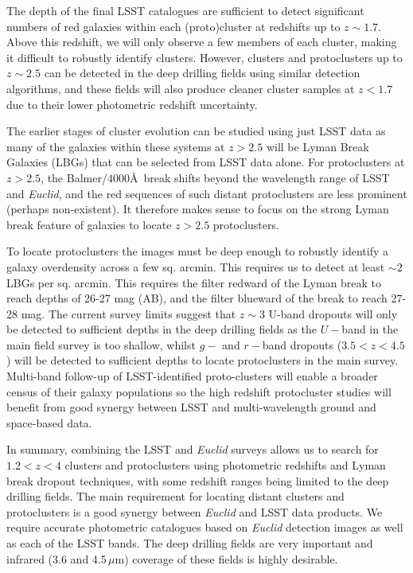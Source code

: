 \documentclass[a4paper,11pt]{article}
\begin{document}
The depth of the final LSST catalogues are sufficient to detect
significant numbers of red galaxies within each (proto)cluster at
redshifts up to $z\sim1.7$. Above this redshift, we will only 
observe a few members of each cluster, making it difficult to robustly identify clusters. 
However, clusters and protoclusters up to
$z\sim2.5$ can be detected in the deep drilling fields using similar detection
algorithms, and these fields will also produce cleaner cluster samples at
$z<1.7$ due to their lower photometric redshift uncertainty.

The earlier stages of cluster
evolution can be studied using just LSST data as many of
the galaxies within these systems at $z>2.5$ will be Lyman Break
Galaxies (LBGs) that can be selected from LSST data alone. 
For protoclusters at $z>2.5$, the Balmer/$4000$\AA\ break shifts
beyond the wavelength range of LSST and \emph{Euclid}, and the red
sequences of such distant protoclusters are less prominent (perhaps
non-existent). It therefore makes sense to focus on the strong Lyman break feature of
galaxies to locate $z>2.5$ protoclusters.

To locate protoclusters the images must be deep enough to robustly
identify a galaxy overdensity across a few sq. arcmin. This requires
us to detect at least $\sim2$ LBGs per sq. arcmin. This requires the
filter redward of the Lyman break to reach depths of 26-27 mag (AB),
and the filter blueward of the break to reach 27-28 mag. The current survey limits suggest that 
$z\sim3$ U-band dropouts will only be detected to
sufficient depths in the deep drilling fields as the $U-$band in the
main field survey is too shallow, whilst $g-$ and $r-$band dropouts ($3.5<z<4.5$) will
be detected to sufficient depths to locate protoclusters in the main
survey. Multi-band follow-up of LSST-identified proto-clusters will enable a
broader census of their galaxy populations so the high redshift
protocluster studies will benefit from good synergy between LSST and  
multi-wavelength ground and space-based data.



In summary, combining the LSST and \emph{Euclid} surveys allows us to search
for $1.2<z<4$ clusters and protoclusters using photometric redshifts and Lyman break dropout
techniques, with some redshift ranges being limited to the deep drilling fields. The main requirement for locating
distant clusters and protoclusters is a good synergy between \emph{Euclid}
and LSST data products. We require accurate photometric catalogues
based on \emph{Euclid} detection images as well as each of the LSST bands. The deep drilling fields are very
important and infrared (3.6 and 4.5\,$\mu$m) coverage of these fields
is highly desirable.
\end{document}
